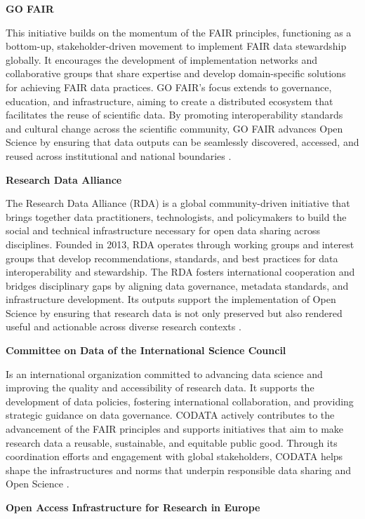 \documentclass[final]{rc-book-2.14}
\begin{document}
\textbf{GO FAIR}

This initiative builds on the momentum of the FAIR principles, functioning as a bottom-up, stakeholder-driven movement to implement FAIR data stewardship globally. It encourages the development of implementation networks and collaborative groups that share expertise and develop domain-specific solutions for achieving FAIR data practices. GO FAIR’s focus extends to governance, education, and infrastructure, aiming to create a distributed ecosystem that facilitates the reuse of scientific data. By promoting interoperability standards and cultural change across the scientific community, GO FAIR advances Open Science by ensuring that data outputs can be seamlessly discovered, accessed, and reused across institutional and national boundaries \cite{henning_go_2019}.


\textbf{Research Data Alliance}

The Research Data Alliance (RDA) is a global community-driven initiative that brings together data practitioners, technologists, and policymakers to build the social and technical infrastructure necessary for open data sharing across disciplines. Founded in 2013, RDA operates through working groups and interest groups that develop recommendations, standards, and best practices for data interoperability and stewardship. The RDA fosters international cooperation and bridges disciplinary gaps by aligning data governance, metadata standards, and infrastructure development. Its outputs support the implementation of Open Science by ensuring that research data is not only preserved but also rendered useful and actionable across diverse research contexts \cite{berman_research_2020}.

\textbf{Committee on Data of the International Science Council}

Is an international organization committed to advancing data science and improving the quality and accessibility of research data. It supports the development of data policies, fostering international collaboration, and providing strategic guidance on data governance. CODATA actively contributes to the advancement of the FAIR principles and supports initiatives that aim to make research data a reusable, sustainable, and equitable public good. Through its coordination efforts and engagement with global stakeholders, CODATA helps shape the infrastructures and norms that underpin responsible data sharing and Open Science \cite{codata_2024}.

\textbf{Open Access Infrastructure for Research in Europe}
\end{document}
